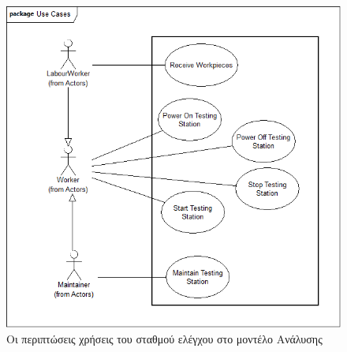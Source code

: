 \documentclass[a4paper,12pt,twoside]{report}
\begin{document}
\begin{appendices}
			\begin{figure}[hp]
					\centering
					\includegraphics[scale=0.30]{AnalysisModel_uc-TestingStationsUseCases.png}
					\caption{Οι περιπτώσεις χρήσεις του σταθμού ελέγχου στο μοντέλο Ανάλυσης}
					\label{φωτ:Οι περιπτώσεις χρήσεις του σταθμού ελέγχου στο μοντέλο Ανάλυσης}
			\end{figure}
			

\end{appendices}
\end{document}
